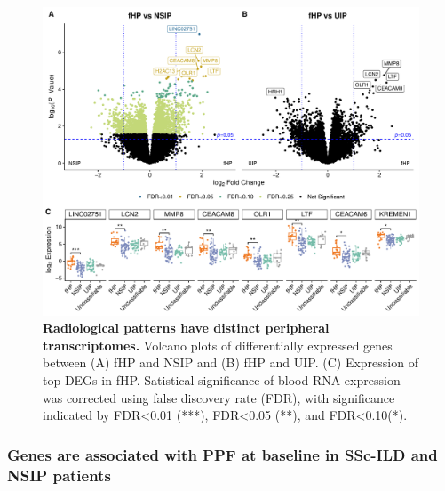 \documentclass[
]{article}
\begin{document}
\begin{figure}

{\centering \includegraphics[width=0.9\linewidth,]{./Figures/BloodRNAseq/radiology_deg_v1} 

}

\caption[Radiological transcriptome]{\textbf{Radiological patterns have distinct peripheral transcriptomes.} Volcano plots of differentially expressed genes between (A) fHP and NSIP and (B) fHP and UIP. (C) Expression of top DEGs in fHP. Satistical significance of blood RNA expression was corrected using false discovery rate (FDR), with significance indicated by FDR\textless0.01 (***), FDR\textless0.05 (**), and FDR\textless0.10(*).}\label{fig:raddeg}
\end{figure}

\subsubsection{Genes are associated with PPF at baseline in SSc-ILD and NSIP patients}\label{genes-are-associated-with-ppf-at-baseline-in-ssc-ild-and-nsip-patients}
\end{document}
